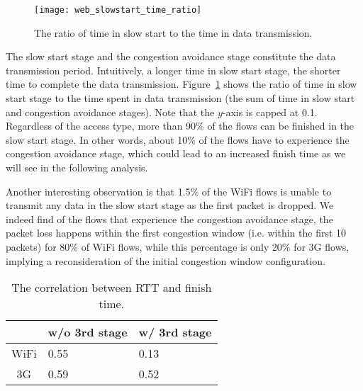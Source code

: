 \begin{figure}[th]
\centering
\texttt{[image: web\_slowstart\_time\_ratio]}
\caption{The ratio of time in slow start to the time in data transmission.}
\label{fig:web_ss_time_ratio}
\end{figure}

The slow start stage and the congestion avoidance stage constitute the data transmission period. Intuitively, a longer time in slow start stage, the shorter time to complete the data transmission. Figure~\ref{fig:web_ss_time_ratio} shows the ratio of time in slow start stage to the time spent in data transmission (\ie the sum of time in slow start and congestion avoidance stages). Note that the $y$-axis is capped at 0.1. Regardless of the access type, more than 90\% of the flows can be finished in the slow start stage. In other words, about 10\% of the flows have to experience the congestion avoidance stage, which could lead to an increased finish time as we will see in the following analysis.

Another interesting observation is that 1.5\% of the WiFi flows is unable to transmit any data in the slow start stage as the first packet is dropped. We indeed find of the flows that experience the congestion avoidance stage, the packet loss happens within the first congestion window (i.e. within the first 10 packets) for 80\% of WiFi flows, while this percentage is only 20\% for 3G flows, implying a reconsideration of the initial congestion window configuration.

\begin{table}[th]
\caption{The correlation between RTT and finish time.}
\label{tab:web_rtt_finish_time_correlation}
\centering
\renewcommand{\arraystretch}{1.0}
\begin{tabular}{c|C{2.5cm}|C{2.5cm}}
   \hline
   & w/o 3rd stage & w/ 3rd stage \\
   \hline
   WiFi & 0.55 & 0.13 \\
   3G & 0.59 & 0.52 \\
   \hline
\end{tabular}
\end{table}

